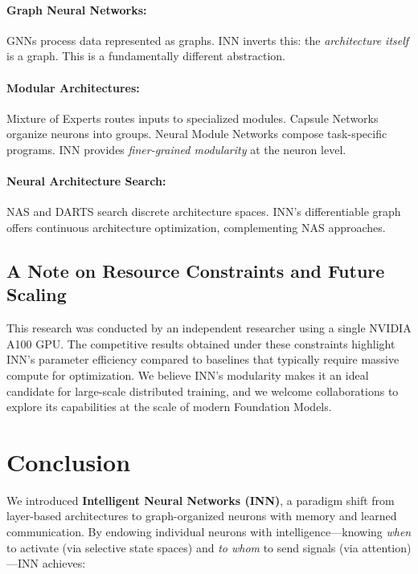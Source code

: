 \documentclass{article}
\begin{document}
\paragraph{Graph Neural Networks:}
GNNs \cite{scarselli2008graph, kipf2016semi} process data represented as graphs. INN inverts this: the \emph{architecture itself} is a graph. This is a fundamentally different abstraction.

\paragraph{Modular Architectures:}
Mixture of Experts \cite{shazeer2017outrageously} routes inputs to specialized modules. Capsule Networks \cite{sabour2017dynamic} organize neurons into groups. Neural Module Networks \cite{andreas2016neural} compose task-specific programs. INN provides \emph{finer-grained modularity} at the neuron level.

\paragraph{Neural Architecture Search:}
NAS \cite{zoph2016neural} and DARTS \cite{liu2018darts} search discrete architecture spaces. INN's differentiable graph offers continuous architecture optimization, complementing NAS approaches.

\subsection{A Note on Resource Constraints and Future Scaling}

This research was conducted by an independent researcher using a single NVIDIA A100 GPU. The competitive results obtained under these constraints highlight INN's parameter efficiency compared to baselines that typically require massive compute for optimization. We believe INN's modularity makes it an ideal candidate for large-scale distributed training, and we welcome collaborations to explore its capabilities at the scale of modern Foundation Models.

\section{Conclusion}

We introduced \textbf{Intelligent Neural Networks (INN)}, a paradigm shift from layer-based architectures to graph-organized neurons with memory and learned communication. By endowing individual neurons with intelligence—knowing \emph{when} to activate (via selective state spaces) and \emph{to whom} to send signals (via attention)—INN achieves:
\end{document}
